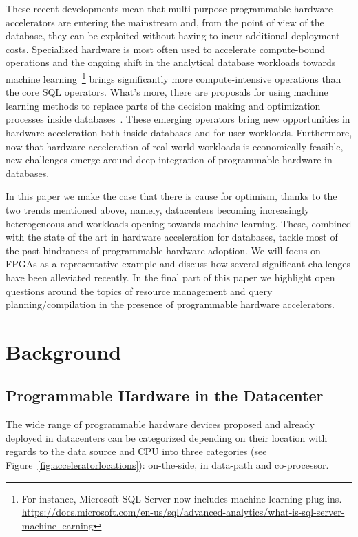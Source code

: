 \documentclass[11pt]{article}
\begin{document}
These recent developments mean that multi-purpose programmable hardware accelerators are entering the mainstream and, from the point of view of the database, they can be exploited without having to incur additional deployment costs. Specialized hardware is most often used to accelerate compute-bound operations and the ongoing shift in the analytical database workloads towards machine learning~\cite{mahajan-danafpga-vldb18}\cite{hellerstein-madlib-vldb12}\footnote{For instance, Microsoft SQL Server now includes machine learning plug-ins. \url{https://docs.microsoft.com/en-us/sql/advanced-analytics/what-is-sql-server-machine-learning}} brings significantly more compute-intensive operations than the core SQL operators. What's more, there are proposals for using machine learning methods to replace parts of the decision making and optimization processes inside databases~\cite{kraska-sage-cidr19}. These emerging operators bring new opportunities in hardware acceleration both inside databases and for user workloads. Furthermore, now that hardware acceleration of real-world workloads is economically feasible, new challenges emerge around deep integration of programmable hardware in databases. 


In this paper we make the case that there is cause for optimism, thanks to the two trends mentioned above, namely, datacenters becoming increasingly heterogeneous and workloads opening towards machine learning. These, combined with the state of the art in hardware acceleration for databases, tackle most of the past hindrances of programmable hardware adoption. We will focus on FPGAs as a representative example and discuss how several significant challenges have been alleviated recently. In the final part of this paper we highlight open questions around the topics of resource management and query planning/compilation in the presence of programmable hardware accelerators.


\section{Background}


\subsection{Programmable Hardware in the Datacenter}


The wide range of programmable hardware devices proposed and already deployed in datacenters can be categorized depending on their location with regards to the data source and CPU into three categories (see Figure~\ref{fig:acceleratorlocations}): on-the-side, in data-path and co-processor.
\end{document}
